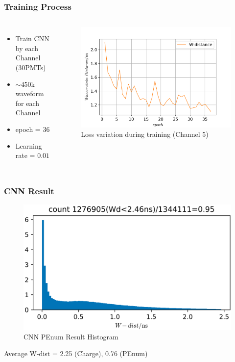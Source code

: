 \documentclass{beamer}
\begin{document}
\begin{frame}
\frametitle{Training Process}
\begin{columns}
\begin{itemize}
    \item Train CNN by each Channel (30PMTs)
    \item $\sim$450k waveform for each Channel
    \item epoch = 36
    \item Learning rate = $0.01$
\end{itemize}
\begin{figure}
    \centering
    \caption{Loss variation during training (Channel 5)}
    \includegraphics[width=1.0\linewidth]{img/epoch.png}
\end{figure}
\end{columns}
\end{frame}

\begin{frame}
\frametitle{CNN Result}
\begin{figure}
    \centering
    \caption{CNN PEnum Result Histogram}
    \includegraphics[width=0.85\linewidth]{img/takarapenumhist.png}
\end{figure}
\begin{center}
    Average W-dist = 2.25 (Charge), 0.76 (PEnum)
\end{center}
\end{frame}
\end{document}
